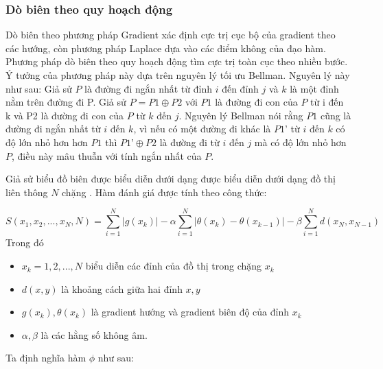 \documentclass[12pt, oneside, a4paper]{book}
\begin{document}
\subsubsection{Dò biên theo quy hoạch động}
Dò biên theo phương pháp Gradient xác định cực trị cục bộ của gradient theo các hướng, còn phương pháp Laplace dựa vào các điểm không của đạo hàm. Phương pháp dò biên theo quy hoạch động tìm cực trị toàn cục theo nhiều bước. Ý tưởng của phương pháp này dựa trên nguyên lý tối ưu Bellman. Nguyên lý này như sau:
Giả sử $P$ là đường đi ngắn nhất từ đỉnh $i$ đến đỉnh $j$ và $k$ là một đỉnh nằm trên đường đi P. Giả sử $P=P1\oplus P2$ với $P1$ là đường đi con của $P$ từ i đến k và P2 là đường đi con của $P$ từ $k$ đến $j$. Nguyên lý Bellman nói rằng $P1$ cũng là đường đi ngắn nhất từ $i$ đến $k$, vì nếu có một đường đi khác là $P1’$ từ $i$ đến $k$ có độ lớn nhỏ hơn hơn $P1$ thì $P1’\oplus P2$ là đường đi từ $i$ đến $j$ mà có độ lớn nhỏ hơn $P$, điều này mâu thuẫn với tính ngắn nhất của $P$.

Giả sử biểu đồ biên được biểu diễn dưới dạng được biểu diễn dưới dạng đồ thị liên thông $N$ chặng . Hàm đánh giá được tính theo công thức:

\begin{equation*}
S(x_1,x_2,...,x_N,N)=\sum_{i=1}^{N}|g(x_k)|-\alpha \sum_{i=1}^{N}|\theta(x_k)-\theta(x_{k-1})|-\beta \sum_{i=1}^{N}d(x_N,x_{N-1})
\end{equation*}
Trong đó 
\begin{itemize}
\item $x_k=1,2,..., N$ biểu diễn các đỉnh của đồ thị trong chặng $x_k$
\item $d(x,y)$ là khoảng cách giữa hai đỉnh $x, y$ 
\item $g(x_k), \theta(x_k)$ là gradient hướng và gradient biên độ của đỉnh $x_k$
\item $\alpha ,\beta$ là các hằng số không âm. 
\end{itemize}
Ta định nghĩa hàm $\phi$ như sau:
\end{document}
